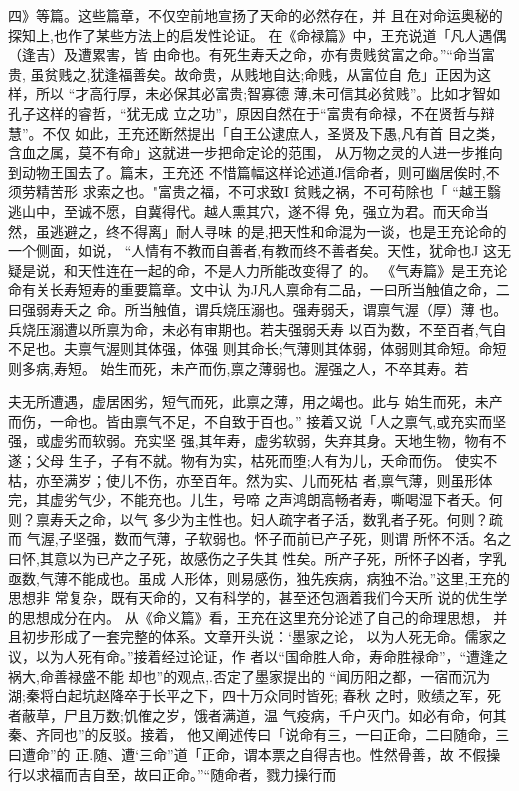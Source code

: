 四》等篇。这些篇章，不仅空前地宣扬了天命的必然存在，并
且在对命运奥秘的探知上,也作了某些方法上的启发性论证。
在《命禄篇》中，王充说道「凡人遇偶（逢吉）及遭累害，皆
由命也。有死生寿夭之命，亦有贵贱贫富之命。”“命当富贵,
虽贫贱之,犹逢福善矣。故命贵，从贱地自达;命贱，从富位自
危」正因为这样，所以 “才高行厚，未必保其必富贵;智寡德
薄,未可信其必贫贱”。比如才智如孔子这样的睿哲，“犹无成
立之功”，原因自然在于“富贵有命禄，不在贤哲与辩慧”。不仅
如此，王充还断然提出「自王公逮庶人，圣贤及下愚,凡有首
目之类，含血之属，莫不有命」这就进一步把命定论的范围，
从万物之灵的人进一步推向到动物王国去了。篇末，王充还
不惜篇幅这样论述道J信命者，则可幽居俟时,不须劳精苦形
求索之也。"富贵之福，不可求致I 贫贱之祸，不可苟除也「
“越王翳逃山中，至诚不愿，自冀得代。越人熏其穴，遂不得
免，强立为君。而天命当然，虽逃避之，终不得离」耐人寻味
的是,把天性和命混为一谈，也是王充论命的一个侧面，如说，
“人情有不教而自善者,有教而终不善者矣。天性，犹命也J
这无疑是说，和天性连在一起的命，不是人力所能改变得了
的。
《气寿篇》是王充论命有关长寿短寿的重要篇章。文中认
为J凡人禀命有二品，一曰所当触值之命，二曰强弱寿夭之
命。所当触值，谓兵烧压溺也。强寿弱夭，谓禀气渥（厚）薄
也。兵烧压溺遭以所禀为命，未必有审期也。若夫强弱夭寿
以百为数，不至百者,气自不足也。夫禀气渥则其体强，体强
则其命长;气薄则其体弱，体弱则其命短。命短则多病,寿短。
始生而死，未产而伤,禀之薄弱也。渥强之人，不卒其寿。若

夫无所遭遇，虚居困劣，短气而死，此禀之薄，用之竭也。此与
始生而死，未产而伤，一命也。皆由禀气不足，不自致于百也。”
接着又说「人之禀气,或充实而坚强，或虚劣而软弱。充实坚
强,其年寿，虚劣软弱，失弃其身。天地生物，物有不遂；父母
生子，子有不就。物有为实，枯死而堕;人有为儿，夭命而伤。
使实不枯，亦至满岁；使儿不伤，亦至百年。然为实、儿而死枯
者,禀气薄，则虽形体完，其虚劣气少，不能充也。儿生，号啼
之声鸿朗高畅者寿，嘶喝湿下者夭。何则？禀寿夭之命，以气
多少为主性也。妇人疏字者子活，数乳者子死。何则？疏而
气渥,子坚强，数而气薄，子软弱也。怀子而前已产子死，则谓
所怀不活。名之曰怀,其意以为已产之子死，故感伤之子失其
性矣。所产子死，所怀子凶者，字乳亟数,气薄不能成也。虽成
人形体，则易感伤，独先疾病，病独不治。”这里,王充的思想非
常复杂，既有天命的，又有科学的，甚至还包涵着我们今天所
说的优生学的思想成分在内。
从《命义篇》看，王充在这里充分论述了自己的命理思想，
并且初步形成了一套完整的体系。文章开头说：‘墨家之论，
以为人死无命。儒家之议，以为人死有命。”接着经过论证，作
者以“国命胜人命，寿命胜禄命”，“遭逢之祸大,命善禄盛不能
却也”的观点,.否定了墨家提出的 “闻历阳之都，一宿而沉为
湖;秦将白起坑赵降卒于长平之下，四十万众同时皆死; 春秋
之时，败绩之军，死者蔽草，尸且万数;饥傕之岁，饿者满道，温
气疫病，千户灭门。如必有命，何其秦、齐同也”的反驳。接着，
他又阐述传曰「说命有三，一曰正命，二曰随命，三曰遭命”的
正.随、遭‘三命”道「正命，谓本票之自得吉也。性然骨善，故
不假操行以求福而吉自至，故曰正命。”“随命者，戮力操行而

